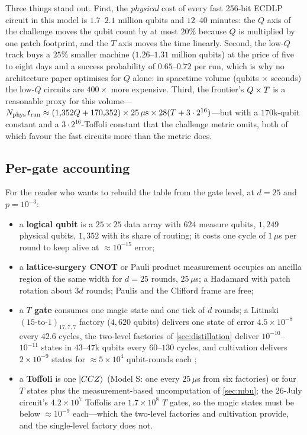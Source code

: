 Three things stand out. First, the \emph{physical} cost of every fast 256-bit ECDLP circuit in this model is $1.7$--$2.1$ million qubits and $12$--$40$ minutes: the $Q$ axis of the challenge moves the qubit count by at most $20\%$ because $Q$ is multiplied by one patch footprint, and the $T$ axis moves the time linearly. Second, the low-$Q$ track buys a $25\%$ smaller machine ($1.26$--$1.31$ million qubits) at the price of five to eight days and a success probability of $0.65$--$0.72$ per run, which is why no architecture paper optimises for $Q$ alone: in spacetime volume (qubits $\times$ seconds) the low-$Q$ circuits are $400\times$ more expensive. Third, the \ecdsafail{} frontier's $Q\times T$ is a reasonable proxy for this volume---$N_{\rm phys}\,t_{\rm run}\approx(1{,}352Q+170{,}352)\times25\,\mu\mathrm{s}\times28(T+3\cdot2^{16})$---but with a $170$k-qubit constant and a $3\cdot2^{16}$-Toffoli constant that the challenge metric omits, both of which favour the fast circuits more than the metric does.

\subsection{Per-gate accounting}
For the reader who wants to rebuild the table from the gate level, at $d=25$ and $p=10^{-3}$:
\begin{itemize}[leftmargin=*]
\item a \textbf{logical qubit} is a $25\times25$ data array with $624$ measure qubits, $1{,}249$ physical qubits, $1{,}352$ with its share of routing; it costs one cycle of $1\,\mu$s per round to keep alive at $\approx10^{-15}$ error;
\item a \textbf{lattice-surgery CNOT} or Pauli product measurement occupies an ancilla region of the same width for $d=25$ rounds, $25\,\mu$s; a Hadamard with patch rotation about $3d$ rounds; Paulis and the Clifford frame are free;
\item a \textbf{$T$ gate} consumes one magic state and one tick of $d$ rounds; a Litinski $(15\text{-to-}1)_{17,7,7}$ factory ($4{,}620$ qubits) delivers one state of error $4.5\times10^{-8}$ every $42.6$ cycles, the two-level factories of \cref{sec:distillation} deliver $10^{-10}$--$10^{-11}$ states in $43$--$47$k qubits every $60$--$130$ cycles, and cultivation delivers $2\times10^{-9}$ states for $\approx5\times10^4$ qubit-rounds each \cite{litinski19magic,cultivation24};
\item a \textbf{Toffoli} is one $\lvert CCZ \rangle$ (Model S: one every $25\,\mu$s from six factories) or four $T$ states plus the measurement-based uncomputation of \cref{sec:mbu}; the \ecdsafail{} 26-July circuit's $4.2\times10^7$ Toffolis are $1.7\times10^8$ $T$ gates, so the magic states must be below $\approx10^{-9}$ each---which the two-level factories and cultivation provide, and the single-level factory does not.
\end{itemize}

